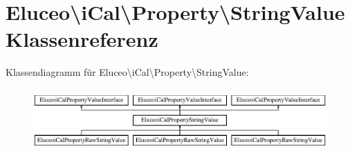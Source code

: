 \hypertarget{class_eluceo_1_1i_cal_1_1_property_1_1_string_value}{}\section{Eluceo\textbackslash{}i\+Cal\textbackslash{}Property\textbackslash{}String\+Value Klassenreferenz}
\label{class_eluceo_1_1i_cal_1_1_property_1_1_string_value}
Klassendiagramm für Eluceo\textbackslash{}i\+Cal\textbackslash{}Property\textbackslash{}String\+Value\+:\begin{figure}[H]
\begin{center}
\leavevmode
\includegraphics[height=2.413793cm]{class_eluceo_1_1i_cal_1_1_property_1_1_string_value}
\end{center}
\end{figure}
